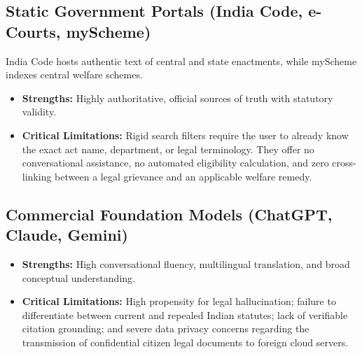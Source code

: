 \subsection{Static Government Portals (India Code, e-Courts, myScheme)}
India Code hosts authentic text of central and state enactments, while myScheme indexes central welfare schemes.
\begin{itemize}
    \item \textbf{Strengths:} Highly authoritative, official sources of truth with statutory validity.
    \item \textbf{Critical Limitations:} Rigid search filters require the user to already know the exact act name, department, or legal terminology. They offer no conversational assistance, no automated eligibility calculation, and zero cross-linking between a legal grievance and an applicable welfare remedy.
\end{itemize}

\subsection{Commercial Foundation Models (ChatGPT, Claude, Gemini)}
\begin{itemize}
    \item \textbf{Strengths:} High conversational fluency, multilingual translation, and broad conceptual understanding.
    \item \textbf{Critical Limitations:} High propensity for legal hallucination; failure to differentiate between current and repealed Indian statutes; lack of verifiable citation grounding; and severe data privacy concerns regarding the transmission of confidential citizen legal documents to foreign cloud servers.
\end{itemize}

